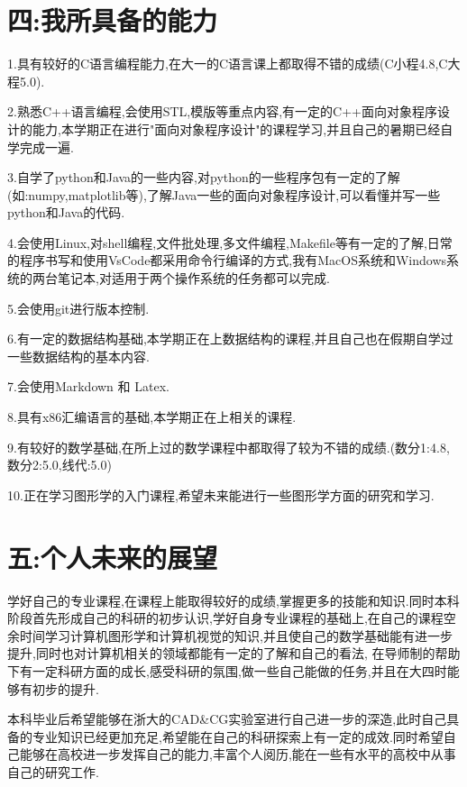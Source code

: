 \documentclass{article}
\begin{document}
\section*{四:我所具备的能力}

1.具有较好的C语言编程能力,在大一的C语言课上都取得不错的成绩(C小程4.8,C大程5.0).

2.熟悉C++语言编程,会使用STL,模版等重点内容,有一定的C++面向对象程序设计的能力,本学期正在进行"面向对象程序设计"的课程学习,并且自己的暑期已经自学完成一遍.

3.自学了python和Java的一些内容,对python的一些程序包有一定的了解(如:numpy,matplotlib等),了解Java一些的面向对象程序设计,可以看懂并写一些python和Java的代码.

4.会使用Linux,对shell编程,文件批处理,多文件编程,Makefile等有一定的了解,日常的程序书写和使用VsCode都采用命令行编译的方式,我有MacOS系统和Windows系统的两台笔记本,对适用于两个操作系统的任务都可以完成.


5.会使用git进行版本控制.

6.有一定的数据结构基础,本学期正在上数据结构的课程,并且自己也在假期自学过一些数据结构的基本内容.

7.会使用Markdown 和 Latex.

8.具有x86汇编语言的基础,本学期正在上相关的课程.

9.有较好的数学基础,在所上过的数学课程中都取得了较为不错的成绩.(数分1:4.8,数分2:5.0,线代:5.0)

10.正在学习图形学的入门课程,希望未来能进行一些图形学方面的研究和学习.
\section*{五:个人未来的展望}
学好自己的专业课程,在课程上能取得较好的成绩,掌握更多的技能和知识.同时本科阶段首先形成自己的科研的初步认识,学好自身专业课程的基础上,在自己的课程空余时间学习计算机图形学和计算机视觉的知识,并且使自己的数学基础能有进一步提升,同时也对计算机相关的领域都能有一定的了解和自己的看法,
在导师制的帮助下有一定科研方面的成长,感受科研的氛围,做一些自己能做的任务,并且在大四时能够有初步的提升.

本科毕业后希望能够在浙大的CAD\&CG实验室进行自己进一步的深造,此时自己具备的专业知识已经更加充足,希望能在自己的科研探索上有一定的成效.同时希望自己能够在高校进一步发挥自己的能力,丰富个人阅历,能在一些有水平的高校中从事自己的研究工作.
\end{document}
